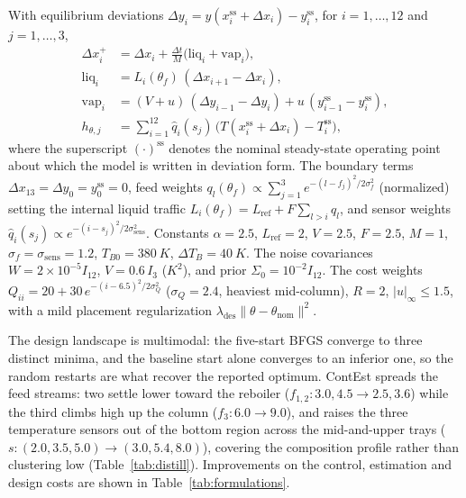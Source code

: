 \documentclass[twocolumn,amsthm]{autart}
\begin{document}
With equilibrium
deviations $\Delta y_i=y(x_i^{\mathrm{ss}}+\Delta x_i)-y_i^{\mathrm{ss}}$, for
$i=1,\dots,12$ and $j=1,\dots,3$,
\begin{subequations}\label{eq:distill-model}
\begin{align}
\Delta x_i^{+} &= \Delta x_i + \tfrac{\Delta t}{M}\big(\mathrm{liq}_i+\mathrm{vap}_i\big),\\
\mathrm{liq}_i &= L_i(\theta_f)\,(\Delta x_{i+1}-\Delta x_i),\\
\mathrm{vap}_i &= (V+u)\,(\Delta y_{i-1}-\Delta y_i) + u\,(y_{i-1}^{\mathrm{ss}}-y_i^{\mathrm{ss}}),\\
h_{\theta,j} &= \textstyle\sum_{i=1}^{12}\hat q_i(s_j)\,\big(T(x_i^{\mathrm{ss}}+\Delta x_i)-T_i^{\mathrm{ss}}\big),
\end{align}
\end{subequations}
where the superscript $(\cdot)^{\mathrm{ss}}$ denotes the nominal steady-state
operating point about which the model is written in deviation form. The
boundary terms $\Delta x_{13}=\Delta y_0=y_0^{\mathrm{ss}}=0$, feed weights
$q_l(\theta_f)\propto \sum_{j=1}^{3}e^{-(l-f_j)^2/2\sigma_f^2}$ (normalized)
setting the internal liquid traffic
$L_i(\theta_f)=L_{\mathrm{ref}}+F\sum_{l>i}q_l$, and sensor weights
$\hat q_i(s_j)\propto e^{-(i-s_j)^2/2\sigma_{\mathrm{sens}}^2}$. Constants $\alpha=2.5$,
$L_{\mathrm{ref}}=2$, $V=2.5$, $F=2.5$, $M=1$,
$\sigma_f=\sigma_{\mathrm{sens}}=1.2$, $T_{B0}=\SI{380}{K}$,
$\Delta T_B=\SI{40}{K}$. The noise covariances $W=2\!\times\!10^{-5}I_{12}$,
$V=0.6\,I_3$ ($\si{K^2}$), and prior $\Sigma_0=10^{-2}I_{12}$. The cost weights
$Q_{ii}=20+30\,e^{-(i-6.5)^2/2\sigma_Q^2}$ ($\sigma_Q=2.4$, heaviest
mid-column), $R=2$,
$|u|_\infty\le1.5$, with a mild placement regularization
$\lambda_{\mathrm{des}}\lVert\theta-\theta_{\mathrm{nom}}\rVert^2$.

The design landscape is multimodal: the five-start BFGS converge to three distinct
minima, and the baseline start alone converges to an inferior one, so the random
restarts are what recover the reported optimum. ContEst spreads the feed
streams: two settle lower toward the reboiler ($f_{1,2}:3.0,4.5\to2.5,3.6$) while
the third climbs high up the column ($f_3:6.0\to9.0$), and raises the three
temperature sensors out of the bottom region across the mid-and-upper trays
($s:(2.0,3.5,5.0)\to(3.0,5.4,8.0)$), covering the composition profile rather than
clustering low (Table~\ref{tab:distill}). Improvements on the control, estimation and design costs are shown in Table~\ref{tab:formulations}.
\end{document}
